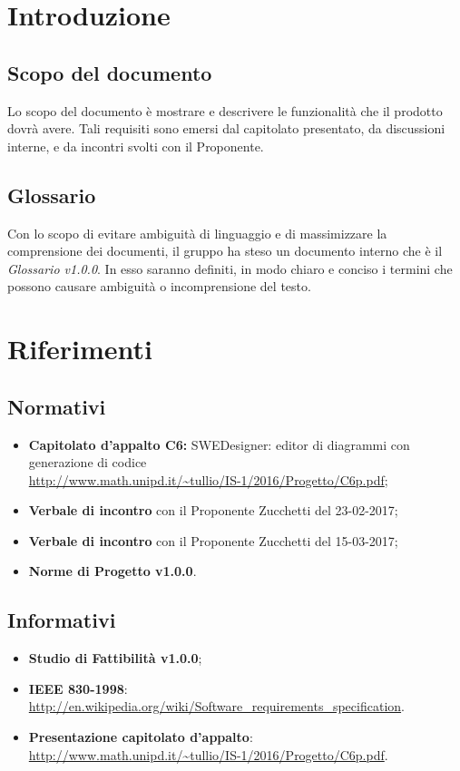 \section{Introduzione}
\subsection{Scopo del documento}
Lo scopo del documento è mostrare e descrivere le funzionalità che il prodotto dovrà avere. Tali requisiti sono emersi dal capitolato presentato, da discussioni interne, e da incontri svolti con il Proponente.

\subsection{Glossario}
          Con lo scopo di evitare ambiguità di linguaggio e di massimizzare la comprensione dei documenti, il
          gruppo ha steso un documento interno che è il \emph{Glossario v1.0.0}. In esso saranno definiti, in modo
          chiaro e conciso i termini che possono causare ambiguità o incomprensione del testo.
  \newpage        
\section{Riferimenti}
\subsection{Normativi}
\begin{itemize}
\item \textbf{Capitolato d'appalto C6:} SWEDesigner: editor di diagrammi  con generazione di codice \\
\url{http://www.math.unipd.it/~tullio/IS-1/2016/Progetto/C6p.pdf};
\item \textbf{Verbale di incontro} con il Proponente Zucchetti del 23-02-2017;
\item \textbf{Verbale di incontro} con il Proponente Zucchetti del 15-03-2017;
\item \textbf{Norme di Progetto v1.0.0}.
\end{itemize}
\subsection{Informativi}
\begin{itemize}
\item \textbf{Studio di Fattibilità v1.0.0};
\item \textbf{IEEE 830-1998}: \url{http://en.wikipedia.org/wiki/Software_requirements_specification}.
\item \textbf{Presentazione capitolato d'appalto}: \url{http://www.math.unipd.it/~tullio/IS-1/2016/Progetto/C6p.pdf}.
\end{itemize}
\newpage
